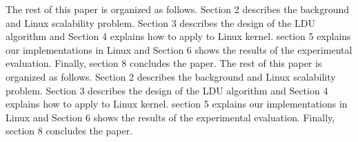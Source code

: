 \fi


\ifkor
The rest of this paper is organized as follows.
Section 2 describes the background and Linux scalability problem.
Section 3 describes the design of the LDU algorithm and 
Section 4 explains how to apply to Linux kernel.
section 5 explains our implementations in Linux and
Section 6 shows the results of the experimental evaluation. 
Finally, section 8 concludes the paper.
\else
The rest of this paper is organized as follows.
Section 2 describes the background and Linux scalability problem.
Section 3 describes the design of the LDU algorithm and 
Section 4 explains how to apply to Linux kernel.
section 5 explains our implementations in Linux and
Section 6 shows the results of the experimental evaluation. 
Finally, section 8 concludes the paper.
\fi

%
%






